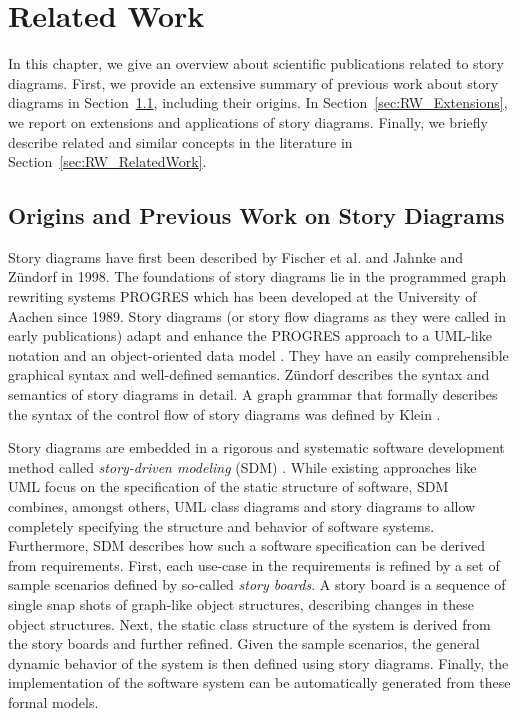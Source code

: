 \chapter{Related Work} 
\label{sec:RelatedWork}
In this chapter, we give an overview about scientific publications related to story diagrams.
First, we provide an extensive summary of previous work about story diagrams in Section~\ref{sec:RW_PreviousWork}, including their origins.
In Section~\ref{sec:RW_Extensions}, we report on extensions and applications of story diagrams.
Finally, we briefly describe related and similar concepts in the literature in Section~\ref{sec:RW_RelatedWork}.

\section{Origins and Previous Work on Story Diagrams}
\label{sec:RW_PreviousWork}

Story diagrams have first been described by Fischer et al. \cite{FNTZ00} and Jahnke and Z\"{u}ndorf \cite{JZ98} in 1998.
The foundations of story diagrams lie in the programmed graph rewriting systems PROGRES \cite{SWZ95} which has been developed at the University of Aachen since 1989.
Story diagrams (or story flow diagrams as they were called in early publications) adapt and enhance the PROGRES approach to a UML-like notation and an object-oriented data model \cite{JZ98}.
They have an easily comprehensible graphical syntax and well-defined semantics.
Z\"{u}ndorf \cite{Zun01} describes the syntax and semantics of story diagrams in detail.
A graph grammar that formally describes the syntax of the control flow of story diagrams was defined by Klein \cite{Kle99}.

Story diagrams are embedded in a rigorous and systematic software development method called \emph{story-driven modeling} (SDM) \cite{Zun01,DGZ04}.
While existing approaches like UML focus on the specification of the static structure of software, SDM combines, amongst others, UML class diagrams and story diagrams to allow completely specifying the structure and behavior of software systems.
Furthermore, SDM describes how such a software specification can be derived from requirements.
First, each use-case in the requirements is refined by a set of sample scenarios defined by so-called \emph{story boards}.
A story board is a sequence of single snap shots of graph-like object structures, describing changes in these object structures.
Next, the static class structure of the system is derived from the story boards and further refined.
Given the sample scenarios, the general dynamic behavior of the system is then defined using story diagrams.
Finally, the implementation of the software system can be automatically generated from these formal models.

